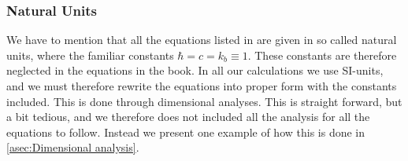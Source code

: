 \documentclass[10pt,a4paper]{article}
\begin{document}
\subsubsection{Natural Units}
\label{subsubsec:Theory/natural units}
We have to mention that all the equations listed in \cite{Dodelson} are given in so called natural units, where the familiar constants $\hbar = c = k_b \equiv 1$. These constants are therefore neglected in the equations in the book. In all our calculations we use SI-units, and we must therefore rewrite the equations into proper form with the constants included. This is done through dimensional analyses. This is straight forward, but a bit tedious, and we therefore does not included all the analysis for all the equations to follow. Instead we present one example of how this is done in \cref{asec:Dimensional analysis}.

\end{document}
